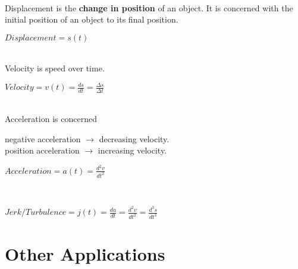 \documentclass[12pt,fleqn]{book} %
\begin{document}
 \\
Displacement is the \textbf{change in position} of an object. It is concerned with the initial position of an object to its final position.

\begin{center}
    {\large $Displacement = s(t)$}

\end{center}

\vspace*{2mm}

 \\
Velocity is speed over time.

\begin{center}
    {\large $Velocity = v(t) = \frac{ds}{dt} = \frac{\Delta s}{\Delta t}$}

\end{center}

\vspace*{2mm}

 \\
Acceleration is concerned

\begin{center}
    negative acceleration $\to$ decreasing velocity. \\
    position acceleration $\to$ increasing velocity.
\end{center}

\begin{center}
    {\large $Acceleration = a(t) = \frac{d^2v}{dt^2}$}

\end{center}

\vspace*{2mm}

 \\

\begin{center}
    {\large $Jerk/Turbulence = j(t) = \frac{da}{dt} = \frac{d^2v}{dt^2} = \frac{d^3s}{dt^3}$}
\end{center}


\vspace*{2mm}



\section{Other Applications}

\begin{center}

\end{center}

\vspace*{-3mm}

\pagebreak

\begin{center}

\end{center}
\end{document}
